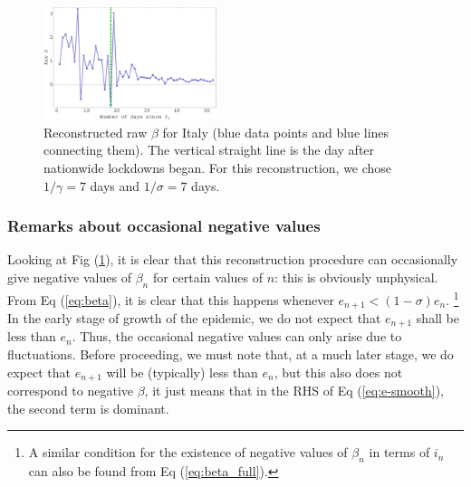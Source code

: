 \documentclass[aps,prd,10pt,twocolumn,nofootinbib]{revtex4-2}
\begin{document}
%
%


\begin{figure}
  \includegraphics[width = 0.45\textwidth]{Italy_beta.pdf}
  \caption
 {Reconstructed raw $\beta$ for Italy (blue data points and blue lines connecting them).  
 The vertical straight line is the day after nationwide lockdowns began.
 For this reconstruction, we chose $1/\gamma = 7$ days and $1/\sigma = 7$ days.
 }
  \label{beta-italy}
\end{figure}

%


\subsubsection{Remarks about occasional negative values} \label{sec:negative}

Looking at Fig (\ref{beta-italy}), it is clear that this reconstruction procedure can occasionally give negative values of $\beta_n$ for certain values of $n$: this is obviously unphysical. From Eq (\ref{eq:beta}), it is clear that this happens whenever  
$e_{n+1} < (1-\sigma) e_n$. 
\footnote{A similar condition for the existence of negative values of $\beta_n$ in terms of $i_n$ can also be found from Eq (\ref{eq:beta_full}).}
In the early stage of growth of the epidemic, we do not expect that $e_{n+1}$ shall be less than $e_n$. Thus, the occasional negative values can only arise due to fluctuations. 
Before proceeding, we must note that, at a much later stage, we do expect that $e_{n+1}$ will be (typically) less than $e_{n}$, but this also does not correspond to negative $\beta$, it just means that in the RHS of Eq (\ref{eq:e-smooth}), the second term is dominant.
\end{document}
